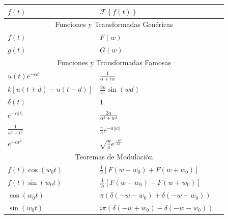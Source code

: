 \documentclass[12pt, fleqn]{report}                             %
\newcommand{\Wrap}[1]{\left( #1 \right)}                        %
\newcommand{\Cos}[1]{\cos\Wrap{#1}}                             %
\newcommand{\Sin}[1]{\sin\Wrap{#1}}                             %
\newcommand{\FourierT}[1]{\mathscr{F} \left\{ #1 \right\} }     %
\begin{document}
            \begin{table}[ht]
                \begin{tabular}{|m{16em}|m{16em}|@{}m{0pt}@{}}
                    \hline
                    \large{$f(t)$}          & \large{$\FourierT{f(t)}$}                 &\\[2em]      \hline\hline
                    
                    \multicolumn{3}{|c|}{Funciones y Transformadas Genéricas}       \\                \hline
                    $f(t)$                  & $F(w)$                                    &\\[1em]      \hline
                    $g(t)$                  & $G(w)$                                    &\\[1em]      \hline\hline

                    \multicolumn{3}{|c|}{Funciones y Transformadas Famosas}         \\                \hline
                    $u(t)e^{-\alpha t}$     & $\frac{1}{\alpha + iw}                    $ &\\[1em]    \hline
                    $k[u(t+d) -u(t-d)]$     & $\frac{2k}{w} \Sin{wd}                    $ &\\[1em]    \hline
                    $\delta(t)        $     & $1                                        $ &\\[1em]    \hline
                    $e^{-\alpha|t|}   $     & $\frac{2\alpha}{\alpha^2+w^2}             $ &\\[1em]    \hline
                    $\frac{1}{a^2+t^2}$     & $\frac{\pi}{a} e^{-a |w|}                 $ &\\[1em]    \hline
                    $e^{-\alpha t^2}  $     & $\sqrt{\frac{\pi}{a}} e^{\frac{-w^2}{4a}} $ &\\[1em]    \hline\hline
                    
                    \multicolumn{3}{|c|}{Teoremas de Modulación}                    \\                \hline
                    $f(t) \Cos{w_0t}  $     & $\frac{1}{2}[F(w-w_0)+F(w+w_0)]           $ &\\[1em]    \hline
                    $f(t) \Sin{w_0t}  $     & $\frac{1}{2i}[F(w-w_0)-F(w+w_0)]          $ &\\[1em]    \hline
                    $\Cos{w_0t}       $     & $\pi(\delta(-w-w_0)+\delta(-w+w_0))       $ &\\[1em]    \hline
                    $\Sin{w_0t}       $     & $i\pi(\delta(-w+w_0)-\delta(-w-w_0))      $ &\\[1em]    \hline
                    
                
                \end{tabular}
            \end{table}
\end{document}
